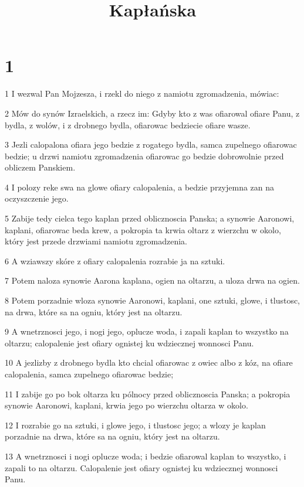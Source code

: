 

\title{Kapłańska}


\chapter{1}

\par 1 I wezwal Pan Mojzesza, i rzekl do niego z namiotu zgromadzenia, mówiac:
\par 2 Mów do synów Izraelskich, a rzecz im: Gdyby kto z was ofiarowal ofiare Panu, z bydla, z wolów, i z drobnego bydla, ofiarowac bedziecie ofiare wasze.
\par 3 Jezli calopalona ofiara jego bedzie z rogatego bydla, samca zupelnego ofiarowac bedzie; u drzwi namiotu zgromadzenia ofiarowac go bedzie dobrowolnie przed obliczem Panskiem.
\par 4 I polozy reke swa na glowe ofiary calopalenia, a bedzie przyjemna zan na oczyszczenie jego.
\par 5 Zabije tedy cielca tego kaplan przed oblicznoscia Panska; a synowie Aaronowi, kaplani, ofiarowac beda krew, a pokropia ta krwia oltarz z wierzchu w okolo, który jest przede drzwiami namiotu zgromadzenia.
\par 6 A wziawszy skóre z ofiary calopalenia rozrabie ja na sztuki.
\par 7 Potem naloza synowie Aarona kaplana, ogien na oltarzu, a uloza drwa na ogien.
\par 8 Potem porzadnie wloza synowie Aaronowi, kaplani, one sztuki, glowe, i tlustosc, na drwa, które sa na ogniu, który jest na oltarzu.
\par 9 A wnetrznosci jego, i nogi jego, oplucze woda, i zapali kaplan to wszystko na oltarzu; calopalenie jest ofiary ognistej ku wdziecznej wonnosci Panu.
\par 10 A jezlizby z drobnego bydla kto chcial ofiarowac z owiec albo z kóz, na ofiare calopalenia, samca zupelnego ofiarowac bedzie;
\par 11 I zabije go po bok oltarza ku pólnocy przed oblicznoscia Panska; a pokropia synowie Aaronowi, kaplani, krwia jego po wierzchu oltarza w okolo.
\par 12 I rozrabie go na sztuki, i glowe jego, i tlustosc jego; a wlozy je kaplan porzadnie na drwa, które sa na ogniu, który jest na oltarzu.
\par 13 A wnetrznosci i nogi oplucze woda; i bedzie ofiarowal kaplan to wszystko, i zapali to na oltarzu. Calopalenie jest ofiary ognistej ku wdziecznej wonnosci Panu.
